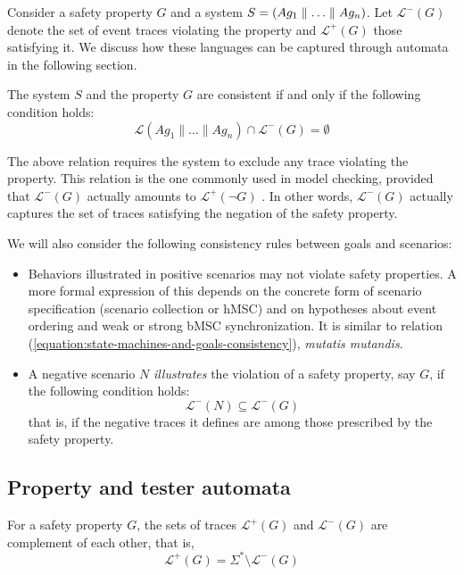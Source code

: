 Consider a safety property $G$ and a system $S = (Ag_1 \parallel \ldots \parallel Ag_n)$. Let $\mathcal{L}^{-}(G)$ denote the set of event traces violating the property and $\mathcal{L}^{+}(G)$ those satisfying it. We discuss how these languages can be captured through automata in the following section.

The system $S$ and the property $G$ are consistent if and only if the following condition holds:
\begin{equation}
\mathcal{L}(Ag_1 \parallel \ldots \parallel Ag_n) \cap \mathcal{L}^{-}(G) = \emptyset
\label{equation:state-machines-and-goals-consistency}
\end{equation}

The above relation requires the system to exclude any trace violating the property. This relation is the one commonly used in model checking, provided that $\mathcal{L}^{-}(G)$ actually amounts to $\mathcal{L}^{+}(\neg G)$ \cite{Clarke:1989}. In other words, $\mathcal{L}^{-}(G)$ actually captures the set of traces satisfying the negation of the safety property.

We will also consider the following consistency rules between goals and scenarios:
\begin{itemize}
\item Behaviors illustrated in positive scenarios may not violate safety properties. A more formal expression of this depends on the concrete form of scenario specification (scenario collection or hMSC) and on hypotheses about event ordering and weak or strong bMSC synchronization. It is similar to relation (\ref{equation:state-machines-and-goals-consistency}), \emph{mutatis mutandis}.
\item A negative scenario $N$ \emph{illustrates} the violation of a safety property, say $G$, if the following condition holds:
\begin{equation}
\mathcal{L}^{-}(N) \subseteq \mathcal{L}^{-}(G)
\end{equation}
\noindent that is, if the negative traces it defines are among those prescribed by the safety property.
\end{itemize}

\subsection{Property and tester automata\label{subsection:background-property-and-tester-automata}}

For a safety property $G$, the sets of traces $\mathcal{L}^{+}(G)$ and $\mathcal{L}^{-}(G)$ are complement of each other, that is,
\begin{equation}
\mathcal{L}^{+}(G) = \Sigma^{*} \setminus \mathcal{L}^{-}(G)
\end{equation}

